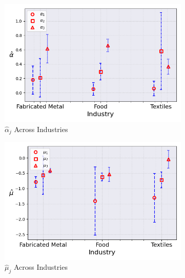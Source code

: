 \documentclass{article}
\begin{document}
\begin{figure}[ht!]
    \centering 
    \caption{AR(1) Normal Model Across Industries ($\hat{M}_0 = 3$)}
    \begin{subfigure}[t]{0.32\textwidth}
        \centering
        \includegraphics[width=\textwidth]{figure/ar1_normal_alpha_across_industries_m3.png}
        \caption{$\hat\alpha_j$ Across Industries}
    \end{subfigure}
    \begin{subfigure}[t]{0.32\textwidth}
        \centering
        \includegraphics[width=\textwidth]{figure/ar1_normal_mu_across_industries_m3.png}
        \caption{$\hat\mu_j$ Across Industries}
    \end{subfigure}
    \begin{subfigure}[t]{0.32\textwidth}
        \centering

\end{subfigure}
\end{figure}
\end{document}
